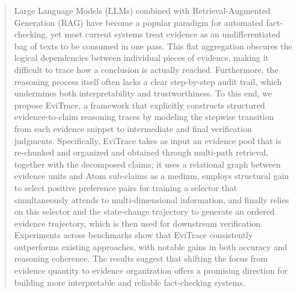 \documentclass[letterpaper]{article}
\begin{document}
\begin{abstract}


Large Language Models (LLMs) combined with Retrieval-Augmented Generation (RAG) have become a popular paradigm for automated fact-checking, yet most current systems treat evidence as an undifferentiated bag of texts to be consumed in one pass. This flat aggregation obscures the logical dependencies between individual pieces of evidence, making it difficult to trace how a conclusion is actually reached. Furthermore, the reasoning process itself often lacks a clear step-by-step audit trail, which undermines both interpretability and trustworthiness. To this end, we propose EviTrace, a framework that explicitly constructs structured evidence-to-claim reasoning traces by modeling the stepwise transition from each evidence snippet to intermediate and final verification judgments.  
Specifically, 
EviTrace takes as input an evidence pool that is re-chunked and organized and obtained through multi-path retrieval, together with the decomposed claims; it uses a relational graph between evidence units and Atom sub-claims as a medium, employs structural gain to select positive preference pairs for training a selector that simultaneously attends to multi-dimensional information, and finally relies on this selector and the state-change trajectory to generate an ordered evidence trajectory, which is then used for downstream verification. 
Experiments across benchmarks show that EviTrace consistently outperforms existing approaches, with notable gains in both accuracy and reasoning coherence. The results suggest that shifting the focus from evidence quantity to evidence organization offers a promising direction for building more interpretable and reliable fact-checking systems.




\end{abstract}
\end{document}

